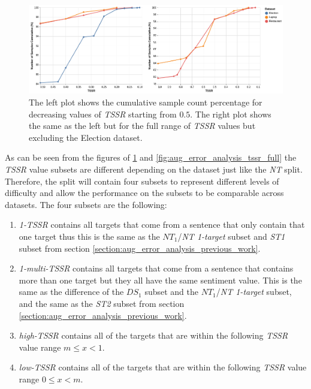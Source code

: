 \begin{figure}[!ht]
    \centering
    \includegraphics[scale=0.42]{images/augmentation/error_analysis/tssr_small_range.png}
    \caption{The left plot shows the cumulative sample count percentage for decreasing values of \textit{TSSR} starting from $0.5$. The right plot shows the same as the left but for the full range of \textit{TSSR} values but excluding the Election dataset.}
    \label{fig:aug_error_analysis_tssr_small}
\end{figure}

As can be seen from the figures of \ref{fig:aug_error_analysis_tssr_small} and \ref{fig:aug_error_analysis_tssr_full} the \textit{TSSR} value subsets are different depending on the dataset just like the \textit{NT} split. Therefore, the split will contain four subsets to represent different levels of difficulty and allow the performance on the subsets to be comparable across datasets. The four subsets are the following:

\begin{enumerate}
    \item \textit{1-TSSR} contains all targets that come from a sentence that only contain that one target thus this is the same as the $NT_1$/\textit{NT 1-target} subset and \textit{ST1} subset from section \ref{section:aug_error_analysis_previous_work}. 
    \item \textit{1-multi-TSSR} contains all targets that come from a sentence that contains more than one target but they all have the same sentiment value. This is the same as the difference of the $DS_1$ subset and the $NT_1$/\textit{NT 1-target} subset, and the same as the \textit{ST2} subset from section \ref{section:aug_error_analysis_previous_work}.
    \item \textit{high-TSSR} contains all of the targets that are within the following \textit{TSSR} value range $m \le x < 1$. 
    \item \textit{low-TSSR} contains all of the targets that are within the following \textit{TSSR} value range $0 \le x < m$.
\end{enumerate}

